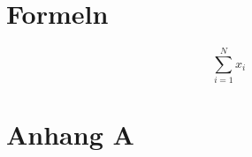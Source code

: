 \documentclass[12pt,oneside]{article}
\begin{document}
\section{Formeln}

\begin{equation}
    \sum_{i=1}^N x_i
    \label{eq:1}
\end{equation}



\clearpage
\lhead{}
\printbibliography
{}


\clearpage
\appendix
\section{Anhang A}


\end{document}
